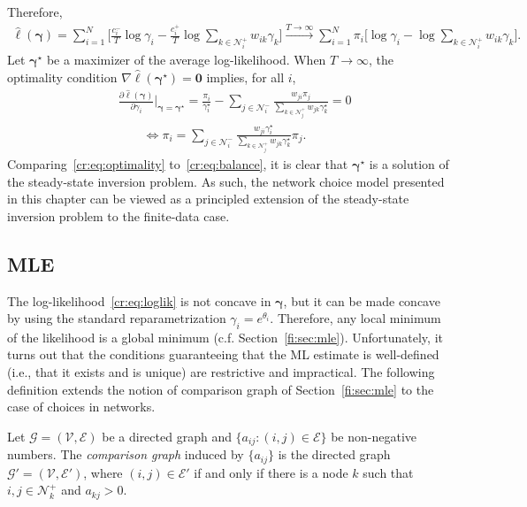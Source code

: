 Therefore,
\begin{align*}
\hat{\ell}(\bm{\gamma})
    = \sum_{i = 1}^N \bigg[ \frac{c^-_i}{T} \log \gamma_i - \frac{c^+_i}{T} \log \sum_{k \in \mathcal{N}^+_i} w_{ik} \gamma_k \bigg]
    \xrightarrow{T \to \infty} \sum_{i = 1}^N \pi_i \bigg[ \log \gamma_i - \log \sum_{k \in \mathcal{N}^+_i} w_{ik} \gamma_k \bigg].
\end{align*}
Let $\bm{\gamma}^\star$ be a maximizer of the average log-likelihood.
When $T \to \infty$, the optimality condition $\nabla \hat{\ell}(\bm{\gamma}^\star) = \bm{0}$ implies, for all $i$,
\begin{align}
&\frac{\partial \hat{\ell}(\bm{\gamma})}{\partial \gamma_i} \bigg|_{\bm{\gamma} = \bm{\gamma}^\star}
    = \frac{\pi_i}{\gamma^\star_i} - \sum_{j \in \mathcal{N}^-_i} \frac{w_{ji} \pi_j}{\sum_{k \in \mathcal{N}^+_j} w_{jk} \gamma^\star_k}
    = 0 \nonumber \\
&\qquad \iff \pi_i = \sum_{j \in \mathcal{N}^-_i} \frac{w_{ji} \gamma^\star_i}{\sum_{k \in \mathcal{N}^+_j} w_{jk} \gamma^\star_k} \pi_j. \label{cr:eq:optimality}
\end{align}
Comparing~\eqref{cr:eq:optimality} to~\eqref{cr:eq:balance}, it is clear that $\bm{\gamma}^\star$ is a solution of the steady-state inversion problem.
As such, the network choice model presented in this chapter can be viewed as a principled extension of the steady-state inversion problem to the finite-data case.


\subsection{MLE}
\label{cr:sec:maxlik}

The log-likelihood~\eqref{cr:eq:loglik} is not concave in $\bm{\gamma}$, but it can be made concave by using the standard reparametrization $\gamma_i = e^{\theta_i}$.
Therefore, any local minimum of the likelihood is a global minimum (c.f. Section~\ref{fi:sec:mle}).
Unfortunately, it turns out that the conditions guaranteeing that the ML estimate is well-defined (i.e., that it exists and is unique) are restrictive and impractical.
The following definition extends the notion of comparison graph of Section~\ref{fi:sec:mle} to the case of choices in networks.

\begin{definition}
Let $\mathcal{G} = (\mathcal{V}, \mathcal{E})$ be a directed graph and $\{ a_{ij} : (i,j) \in \mathcal{E} \}$ be non-negative numbers.
The \emph{comparison graph} induced by $\{ a_{ij} \}$ is the directed graph $\mathcal{G}' = (\mathcal{V}, \mathcal{E}')$, where $(i,j) \in \mathcal{E}'$ if and only if there is a node $k$ such that $i, j \in \mathcal{N}^+_k$ and $a_{kj} > 0$.
\end{definition}

